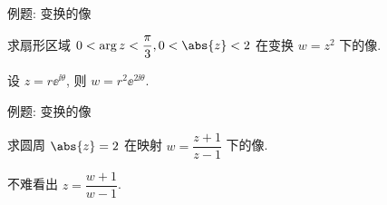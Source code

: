 \begin{frame}{例题: 变换的像}
	\onslide<+->
	\begin{example}[nearnext]
		求扇形区域 $0<\arg z<\dfrac\pi3,0<\abs{z}<2$ 在变换 $w=z^2$ 下的像.
	\end{example}
	\onslide<+->
	\begin{solution}[nearprev]
		设 $z=r\ee^{\ii\theta}$, 则 $w=r^2\ee^{2\ii\theta}$.
		\bigdel
	\end{solution}
\end{frame}


\begin{frame}{例题: 变换的像}
	\onslide<+->
	\begin{example}[nearnext]
		求圆周 $\abs{z}=2$ 在映射 $w=\dfrac{z+1}{z-1}$ 下的像.
	\end{example}
	\onslide<+->
	\begin{solution}[nearprev]
		不难看出 $z=\dfrac{w+1}{w-1}$.
		\onslide<+->{%
			\[
				w\ov w-\dfrac53 w-\dfrac53\ov w+1=0.
			\]
		}\meddel
	\end{solution}
\end{frame}


